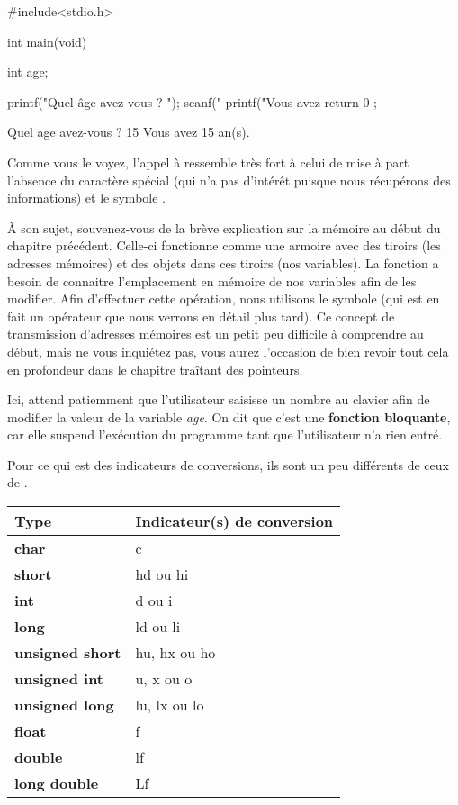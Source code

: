\begin{C}
#include<stdio.h>

int main(void)
{
    int age;

     printf("Quel âge avez-vous ? ");
     scanf("%
     printf("Vous avez %
    return 0 ;
}
\end{C}


\begin{C}
Quel age avez-vous ? 15
Vous avez 15 an(s).
\end{C}

Comme vous le voyez, l'appel à  ressemble très fort à
celui de  mise à part l'absence du caractère spécial (qui n'a pas d'intérêt puisque nous
récupérons des informations) et le symbole \mybox{\&}.

À son sujet, souvenez-vous de la brève explication sur la mémoire au
début du chapitre précédent. Celle-ci fonctionne comme une armoire avec
des tiroirs (les adresses mémoires) et des objets dans ces tiroirs (nos
variables). La fonction  a besoin de connaitre
l'emplacement en mémoire de nos variables afin de les modifier. Afin
d'effectuer cette opération, nous utilisons le symbole \mybox{\&} (qui
est en fait un opérateur que nous verrons en détail plus tard). Ce
concept de transmission d'adresses mémoires est un petit peu difficile à
comprendre au début, mais ne vous inquiétez pas, vous aurez l'occasion
de bien revoir tout cela en profondeur dans le chapitre traîtant des
pointeurs.

Ici,  attend patiemment que l'utilisateur saisisse un
nombre au clavier afin de modifier la valeur de la variable \emph{age}.
On dit que c'est une \textbf{fonction bloquante}, car elle suspend
l'exécution du programme tant que l'utilisateur n'a rien entré.

Pour ce qui est des indicateurs de conversions, ils sont un peu
différents de ceux de .

\begin{table}[ht!]
\centering
\begin{tabular}{|l|l|}\hline
\rowcolor{gris-tab-entete}\textbf{Type} & \textbf{Indicateur(s) de conversion}\tabularnewline\hline
\rowcolor{gris-clair-tab}\textbf{char} & c\tabularnewline\hline
\textbf{short} & hd ou hi\tabularnewline\hline
\rowcolor{gris-clair-tab}\textbf{int} & d ou i\tabularnewline\hline
\textbf{long} & ld ou li\tabularnewline\hline
\rowcolor{gris-clair-tab}\textbf{unsigned short} & hu, hx ou ho\tabularnewline\hline
\textbf{unsigned int} & u, x ou o\tabularnewline\hline
\rowcolor{gris-clair-tab}\textbf{unsigned long} & lu, lx ou lo\tabularnewline\hline
\textbf{float} & f\tabularnewline\hline
\rowcolor{gris-clair-tab}\textbf{double} & lf\tabularnewline\hline
\textbf{long double} & Lf\tabularnewline\hline
\end{tabular}
\end{table}

